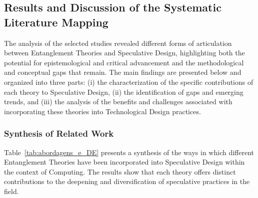 \subsection{Results and Discussion of the Systematic Literature Mapping}

The analysis of the selected studies revealed different forms of articulation between Entanglement Theories and Speculative Design, highlighting both the potential for epistemological and critical advancement and the methodological and conceptual gaps that remain. The main findings are presented below and organized into three parts: (i) the characterization of the specific contributions of each theory to Speculative Design, (ii) the identification of gaps and emerging trends, and (iii) the analysis of the benefits and challenges associated with incorporating these theories into Technological Design practices.

\subsubsection{Synthesis of Related Work}

Table~\ref{tab:abordagens_e_DE} presents a synthesis of the ways in which different Entanglement Theories have been incorporated into Speculative Design within the context of Computing. The results show that each theory offers distinct contributions to the deepening and diversification of speculative practices in the field.


